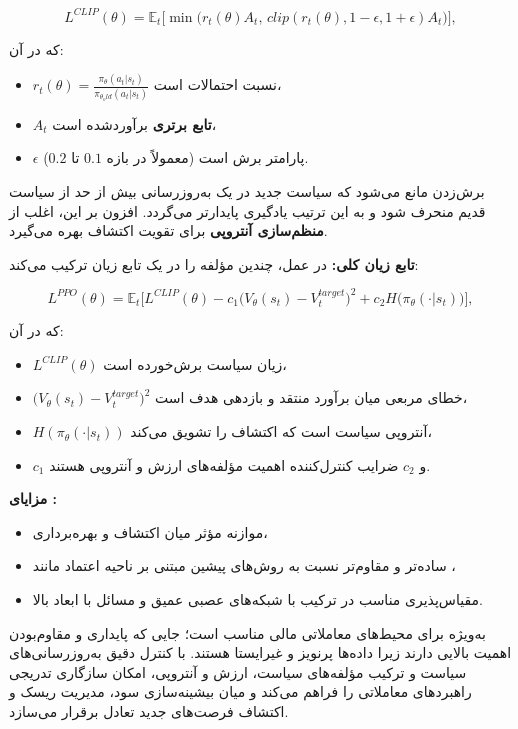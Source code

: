 \documentclass[12pt, a4paper]{report}
\begin{document}
\[
L^{CLIP}(\theta) = \mathbb{E}_t \Big[ 
    \min\big( r_t(\theta) A_t,\,
    clip(r_t(\theta), 1-\epsilon, 1+\epsilon) A_t \big)
\Big],
\]

که در آن:
\begin{itemize}
    \item $r_t(\theta) = \tfrac{\pi_\theta(a_t|s_t)}{\pi_{\theta_old}(a_t|s_t)}$ نسبت احتمالات است،
    \item $A_t$ \textbf{تابع برتری} برآوردشده است،
    \item $\epsilon$ پارامتر برش است (معمولاً در بازه $0.1$ تا $0.2$).
\end{itemize}

برش‌زدن مانع می‌شود که سیاست جدید در یک به‌روزرسانی بیش از حد از سیاست قدیم منحرف شود و به این ترتیب یادگیری پایدارتر می‌گردد. افزون بر این،  اغلب از \textbf{منظم‌سازی آنتروپی} برای تقویت اکتشاف بهره می‌گیرد.  

\bigskip
\textbf{تابع زیان کلی:}  
در عمل،  چندین مؤلفه را در یک تابع زیان ترکیب می‌کند:  

\[
L^{PPO}(\theta) = \mathbb{E}_t \Big[ 
    L^{CLIP}(\theta) 
    - c_1 \big( V_\theta(s_t) - V_t^{target} \big)^2 
    + c_2 H\big( \pi_\theta(\cdot|s_t) \big)
\Big],
\]

که در آن:  
\begin{itemize}
    \item $L^{CLIP}(\theta)$ زیان سیاست برش‌خورده است،
    \item $\big( V_\theta(s_t) - V_t^{target} \big)^2$ خطای مربعی میان برآورد منتقد و بازدهی هدف است،
    \item $H(\pi_\theta(\cdot|s_t))$ آنتروپی سیاست است که اکتشاف را تشویق می‌کند،
    \item $c_1$ و $c_2$ ضرایب کنترل‌کننده اهمیت مؤلفه‌های ارزش و آنتروپی هستند.
\end{itemize}

\textbf{مزایای :}
\begin{itemize}
    \item موازنه مؤثر میان اکتشاف و بهره‌برداری،  
    \item ساده‌تر و مقاوم‌تر نسبت به روش‌های پیشین مبتنی بر ناحیه اعتماد مانند ،  
    \item مقیاس‌پذیری مناسب در ترکیب با شبکه‌های عصبی عمیق و مسائل با ابعاد بالا.  
\end{itemize}

 به‌ویژه برای محیط‌های معاملاتی مالی مناسب است؛ جایی که پایداری و مقاوم‌بودن اهمیت بالایی دارند زیرا داده‌ها پرنویز و غیرایستا هستند. با کنترل دقیق به‌روزرسانی‌های سیاست و ترکیب مؤلفه‌های سیاست، ارزش و آنتروپی،  امکان سازگاری تدریجی راهبردهای معاملاتی را فراهم می‌کند و میان بیشینه‌سازی سود، مدیریت ریسک و اکتشاف فرصت‌های جدید تعادل برقرار می‌سازد.  
  
\end{document}
